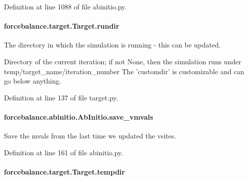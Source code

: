Definition at line 1088 of file abinitio.\-py.

\hypertarget{classforcebalance_1_1target_1_1Target_a6872de5b2d4273b82336ea5b0da29c9e}{
\paragraph[{rundir}]{\setlength{\rightskip}{0pt plus 5cm}forcebalance.\-target.\-Target.\-rundir\hspace{0.3cm}{\ttfamily [inherited]}}}\label{classforcebalance_1_1target_1_1Target_a6872de5b2d4273b82336ea5b0da29c9e}


The directory in which the simulation is running -\/ this can be updated. 

Directory of the current iteration; if not None, then the simulation runs under temp/target\-\_\-name/iteration\-\_\-number The 'customdir' is customizable and can go below anything.

Definition at line 137 of file target.\-py.

\hypertarget{classforcebalance_1_1abinitio_1_1AbInitio_a22037bf43728fa45f387390005e0b131}{
\paragraph[{save\-\_\-vmvals}]{\setlength{\rightskip}{0pt plus 5cm}forcebalance.\-abinitio.\-Ab\-Initio.\-save\-\_\-vmvals}}\label{classforcebalance_1_1abinitio_1_1AbInitio_a22037bf43728fa45f387390005e0b131}


Save the mvals from the last time we updated the vsites. 



Definition at line 161 of file abinitio.\-py.

\hypertarget{classforcebalance_1_1target_1_1Target_aa1f01b5b78db253b5b66384ed11ed193}{
\paragraph[{tempdir}]{\setlength{\rightskip}{0pt plus 5cm}forcebalance.\-target.\-Target.\-tempdir\hspace{0.3cm}{\ttfamily [inherited]}}}\label{classforcebalance_1_1target_1_1Target_aa1f01b5b78db253b5b66384ed11ed193}


